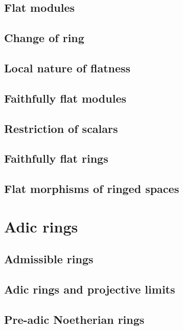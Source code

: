 \subsection{Flat modules}
\label{0-prelim-6.1}

\subsection{Change of ring}
\label{0-prelim-6.2}

\subsection{Local nature of flatness}
\label{0-prelim-6.3}

\subsection{Faithfully flat modules}
\label{0-prelim-6.4}

\subsection{Restriction of scalars}
\label{0-prelim-6.5}

\subsection{Faithfully flat rings}
\label{0-prelim-6.6}

\subsection{Flat morphisms of ringed spaces}
\label{0-prelim-6.7}

\section{Adic rings}
\label{0-prelim-7}

\subsection{Admissible rings}
\label{0-prelim-7.1}

\subsection{Adic rings and projective limits}
\label{0-prelim-7.2}

\subsection{Pre-adic Noetherian rings}
\label{0-prelim-7.3}

